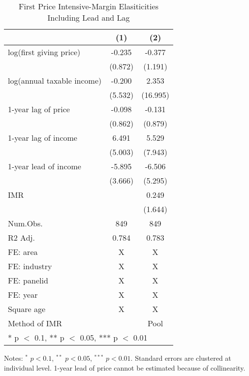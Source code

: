 \documentclass[
  11pt,
  a4paper,
]{article}
\begin{document}
\begin{table}

\caption{\label{tab:leadlagbenchmark}First Price Intensive-Margin Elasiticities Including Lead and Lag}
\centering
\fontsize{9}{11}\selectfont
\begin{threeparttable}
\begin{tabular}[t]{lcc}
\toprule
  & (1) & (2)\\
\midrule
log(first giving price) & -0.235 & -0.377\\
 & (0.872) & (1.191)\\
log(annual taxable income) & -0.200 & 2.353\\
 & (5.532) & (16.995)\\
1-year lag of price & -0.098 & -0.131\\
 & (0.862) & (0.879)\\
1-year lag of income & 6.491 & 5.529\\
 & (5.003) & (7.943)\\
1-year lead of income & -5.895 & -6.506\\
 & (3.666) & (5.295)\\
IMR &  & 0.249\\
 &  & (1.644)\\
\midrule
Num.Obs. & 849 & 849\\
R2 Adj. & 0.784 & 0.783\\
FE: area & X & X\\
FE: industry & X & X\\
FE: panelid & X & X\\
FE: year & X & X\\
Square age & X & X\\
Method of IMR &  & Pool\\
\bottomrule
\multicolumn{3}{l}{\rule{0pt}{1em}* p $<$ 0.1, ** p $<$ 0.05, *** p $<$ 0.01}\\
\end{tabular}
\begin{tablenotes}
\item Notes: $^{*}$ $p < 0.1$, $^{**}$ $p < 0.05$, $^{***}$ $p < 0.01$. Standard errors are clustered at individual level. 1-year lead of price cannot be estimated because of collinearity.
\end{tablenotes}
\end{threeparttable}
\end{table}
\end{document}

